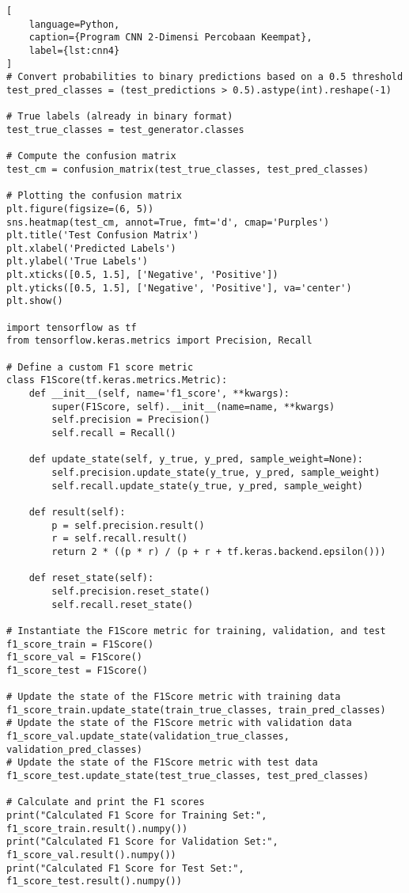 \begin{lstlisting}[
    language=Python,
    caption={Program CNN 2-Dimensi Percobaan Keempat},
    label={lst:cnn4}
]
# Convert probabilities to binary predictions based on a 0.5 threshold
test_pred_classes = (test_predictions > 0.5).astype(int).reshape(-1)

# True labels (already in binary format)
test_true_classes = test_generator.classes

# Compute the confusion matrix
test_cm = confusion_matrix(test_true_classes, test_pred_classes)

# Plotting the confusion matrix
plt.figure(figsize=(6, 5))
sns.heatmap(test_cm, annot=True, fmt='d', cmap='Purples')
plt.title('Test Confusion Matrix')
plt.xlabel('Predicted Labels')
plt.ylabel('True Labels')
plt.xticks([0.5, 1.5], ['Negative', 'Positive'])
plt.yticks([0.5, 1.5], ['Negative', 'Positive'], va='center')
plt.show()

import tensorflow as tf
from tensorflow.keras.metrics import Precision, Recall

# Define a custom F1 score metric
class F1Score(tf.keras.metrics.Metric):
    def __init__(self, name='f1_score', **kwargs):
        super(F1Score, self).__init__(name=name, **kwargs)
        self.precision = Precision()
        self.recall = Recall()

    def update_state(self, y_true, y_pred, sample_weight=None):
        self.precision.update_state(y_true, y_pred, sample_weight)
        self.recall.update_state(y_true, y_pred, sample_weight)

    def result(self):
        p = self.precision.result()
        r = self.recall.result()
        return 2 * ((p * r) / (p + r + tf.keras.backend.epsilon()))

    def reset_state(self):
        self.precision.reset_state()
        self.recall.reset_state()

# Instantiate the F1Score metric for training, validation, and test
f1_score_train = F1Score()
f1_score_val = F1Score()
f1_score_test = F1Score()

# Update the state of the F1Score metric with training data
f1_score_train.update_state(train_true_classes, train_pred_classes)
# Update the state of the F1Score metric with validation data
f1_score_val.update_state(validation_true_classes, validation_pred_classes)
# Update the state of the F1Score metric with test data
f1_score_test.update_state(test_true_classes, test_pred_classes)

# Calculate and print the F1 scores
print("Calculated F1 Score for Training Set:", f1_score_train.result().numpy())
print("Calculated F1 Score for Validation Set:", f1_score_val.result().numpy())
print("Calculated F1 Score for Test Set:", f1_score_test.result().numpy())


\end{lstlisting}
